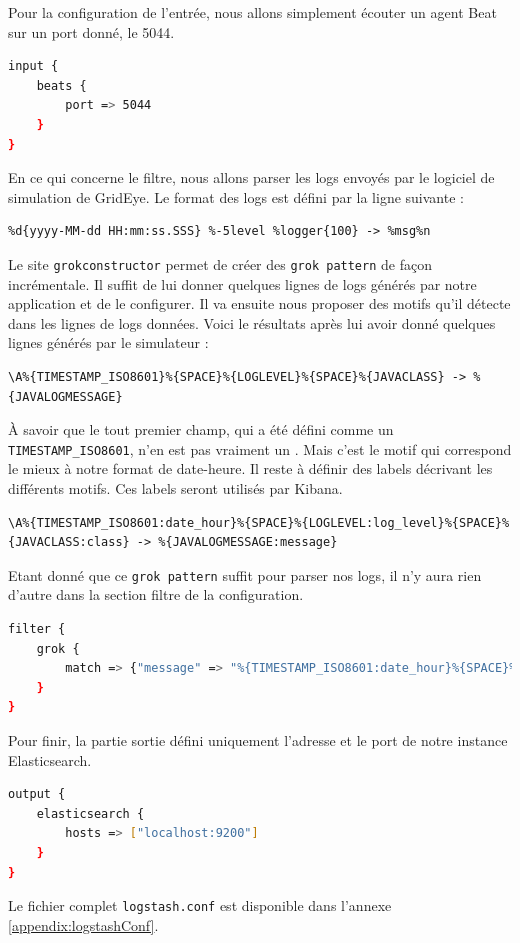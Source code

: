 \documentclass[paper=a4, fontsize=11pt]{scrartcl}
\begin{document}
Pour la configuration de l'entrée, nous allons simplement écouter un agent Beat sur un port donné, le 5044.
\begin{lstlisting}[language=bash]
input {
    beats {
        port => 5044
    }
}
\end{lstlisting}
En ce qui concerne le filtre, nous allons parser les logs envoyés par le logiciel de simulation de GridEye. Le format des logs est défini par la ligne suivante :
\begin{lstlisting}
%d{yyyy-MM-dd HH:mm:ss.SSS} %-5level %logger{100} -> %msg%n
\end{lstlisting}
Le site \verb,grokconstructor, \cite{noauthor_test_nodate} permet de créer des \verb,grok pattern, de façon incrémentale. Il suffit de lui donner quelques lignes de logs générés par notre application et de le configurer. Il va ensuite nous proposer des motifs qu'il détecte dans les lignes de logs données. Voici le résultats après lui avoir donné quelques lignes générés par le simulateur :
\begin{lstlisting}
\A%{TIMESTAMP_ISO8601}%{SPACE}%{LOGLEVEL}%{SPACE}%{JAVACLASS} -> %{JAVALOGMESSAGE}
\end{lstlisting}
À savoir que le tout premier champ, qui a été défini comme un \verb,TIMESTAMP_ISO8601,, n'en est pas vraiment un \cite{noauthor_iso_2020}. Mais c'est le motif qui correspond le mieux à notre format de date-heure.
Il reste à définir des labels décrivant les différents motifs. Ces labels seront utilisés par Kibana.
\begin{lstlisting}
\A%{TIMESTAMP_ISO8601:date_hour}%{SPACE}%{LOGLEVEL:log_level}%{SPACE}%{JAVACLASS:class} -> %{JAVALOGMESSAGE:message}
\end{lstlisting}
Etant donné que ce \verb,grok pattern, suffit pour parser nos logs, il n'y aura rien d'autre dans la section filtre de la configuration.
\begin{lstlisting}[language=bash]
filter { 
    grok { 
        match => {"message" => "%{TIMESTAMP_ISO8601:date_hour}%{SPACE}%{LOGLEVEL:log_level}%{SPACE}%{JAVACLASS:class} -> %{JAVALOGMESSAGE:log_message}"}
    }
}
\end{lstlisting}
Pour finir, la partie sortie défini uniquement l'adresse et le port de notre instance Elasticsearch.
\begin{lstlisting}[language=bash]
output {
    elasticsearch {
        hosts => ["localhost:9200"]
    }
}
\end{lstlisting}
Le fichier complet \verb,logstash.conf, est disponible dans l'annexe \ref{appendix:logstashConf}.
\end{document}
